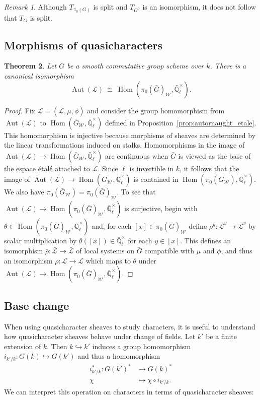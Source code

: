 \documentclass[10pt]{amsart}
\theoremstyle{plain}
\newtheorem{theorem}{Theorem}[section]
\theoremstyle{definition}
\theoremstyle{remark}
\newtheorem{remark}[theorem]{Remark}
\newcommand{\EE}{\mathbb{\bar Q}_\ell}
\newcommand{\Fq}{k}
\newcommand{\EEx}{\EE^\times}
\newcommand{\Weil}[1]{\mathcal{W}_{#1}}
\DeclareMathOperator{\Aut}{Aut}
\DeclareMathOperator{\Hom}{Hom}
\newcommand{\iso}{{\ \cong\ }}
\newcommand{\TrFrob}[1]{T_{#1}}
\newcommand{\qcs}[1]{{\mathcal{#1}}}
\newcommand{\gqcs}[1]{{\mathcal{\bar #1}}}
\newcommand{\bG}{\bar{G}}
\begin{document}
\begin{remark}
Although $\TrFrob{\pi_0(G)}$ is split and $\TrFrob{G^0}$ is an isomorphism, it does not follow that $\TrFrob{G}$ is split. 
\end{remark}

\subsection{Morphisms of quasicharacters} \label{ssec:qcmor}

\begin{theorem}\label{thm:autornaught}
Let $G$ be a smooth commutative group scheme over $\Fq$.
There is a canonical isomorphism
\[
\Aut(\qcs{L}) \iso \Hom(\pi_0(\bG)_{\Weil{}},\EEx).
\]
\end{theorem}
\begin{proof} 
Fix $\qcs{L} = (\gqcs{L},\mu,\phi)$ and consider the group homomorphism from $\Aut(\qcs{L})$ to $\Hom(\bG_{\Weil{}},\EEx)$ defined in Proposition~\ref{prop:autornaught_etale}.
This homomorphism is injective because morphisms of sheaves are determined by the linear transformations induced on stalks.  
Homomorphisms in the image of $\Aut(\qcs{L}) \to \Hom(\bG_{\Weil{}},\EEx)$ are continuous when $\bG$ is viewed as the base of the espace \'etal\'e attached to $\gqcs{L}$.
Since $\ell$ is invertible in $\Fq$, it follows that the image of $\Aut(\qcs{L}) \to \Hom(\bG_{\Weil{}},\EEx)$ is contained in $\Hom(\pi_0(\bG_{\Weil{}}),\EEx)$. 
We also have $\pi_0(\bG_{\Weil{}})=\pi_0(\bG)_{\Weil{}}$. 
To see that $\Aut(\qcs{L}) \to \Hom(\pi_0(\bG)_{\Weil{}},\EEx)$ is surjective, begin with $\theta\in\Hom(\pi_0(\bG)_{\Weil{}},\EEx)$ and, for each $[x] \in \pi_0(\bG)_{\Weil{}}$ define $\bar\rho^y: \gqcs{L}^y \to \gqcs{L}^y$ by scalar multiplication by $\theta([x])\in \EEx$ for each $y\in [x]$.
This defines an isomorphism $\bar\rho : \gqcs{L}\to \gqcs{L}$ of local systems on $\bG$ compatible with $\mu$ and $\phi$, and thus an isomorphism $\rho :\qcs{L}\to \qcs{L}$ which maps to $\theta$ under $\Aut(\qcs{L}) \to \Hom(\pi_0(\bG)_{\Weil{}},\EEx)$.
\end{proof}

\subsection{Base change}\label{ssec:basechange}

When using quasicharacter sheaves to study characters, it is useful to understand
how quasicharacter sheaves behave under change of fields.
Let $k'$ be a finite extension of $k$. Then $k \hookrightarrow k'$ induces a group homomorphism
$i_{k'/k} : G(k) \hookrightarrow G(k')$ and thus a homomorphism
\begin{align*}
i_{k'/k}^* : G(k')^* &\to G(k)^* \\
\chi &\mapsto \chi\circ i_{k'/k}.
\end{align*}
We can interpret this operation on characters in terms of quasicharacter sheaves:
\end{document}

